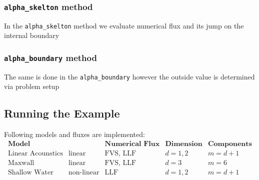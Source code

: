 \documentclass[a4paper,12pt]{article}
\theoremstyle{definition}
\theoremstyle{definition}
\begin{document}
\subsubsection*{\lstinline{alpha_skelton} method}
In the \lstinline{alpha_skelton} method we evaluate numerical flux and its jump on the internal boundary



\subsubsection*{\lstinline{alpha_boundary} method}
The same is done in the \lstinline{alpha_boundary} however the outside value is determined via problem setup  



\subsection{Running the Example}

Following models and fluxes are implemented: 
$$
\begin{array}{c|c|c|c|c}
\textbf{Model} & &\textbf{Numerical Flux}  & \textbf{Dimension} & \textbf{Components} \\  \hline
\text{Linear Acounstics} & \text{linear}& \text{FVS, LLF} & d = 1,2 & m = d + 1  \\
\text{Maxwall       }    & \text{linear} & \text{FVS, LLF} & d = 3 & m = 6 \\
\text{Shallow Water} & \text{non-linear} &\text{LLF} & d = 1,2 & m = d+1
\end{array}
$$





\end{document}
